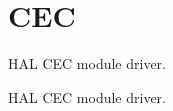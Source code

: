 \hypertarget{group___c_e_c}{}\section{C\+EC}
\label{group___c_e_c}


H\+AL C\+EC module driver.  


H\+AL C\+EC module driver. 

